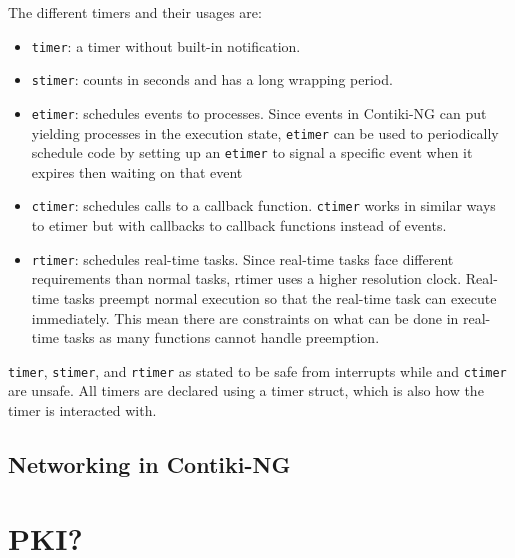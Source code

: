 \documentclass[0-thesis.tex]{subfiles}
\begin{document}
The different timers and their usages are:
\begin{itemize}
    \item \texttt{timer}: a timer without built-in notification.
    \item \texttt{stimer}: counts in seconds and has a long wrapping period.
    \item \texttt{etimer}: schedules events to processes. Since events in Contiki-NG
            can put yielding processes in the execution state, \texttt{etimer} can be
            used to periodically schedule code by setting up an \texttt{etimer} to
            signal a specific event when it expires then waiting on that event
    \item \texttt{ctimer}: schedules calls to a callback function. \texttt{ctimer}
            works in similar ways to etimer but with callbacks to callback functions
            instead of events.
    \item \texttt{rtimer}: schedules real-time tasks. Since real-time tasks face
            different requirements than normal tasks, rtimer uses a higher resolution
            clock. Real-time tasks preempt normal execution so that the real-time task can
            execute immediately. This mean there are constraints on what can be done in
            real-time tasks as many functions cannot handle preemption.
\end{itemize}

\texttt{timer}, \texttt{stimer}, and \texttt{rtimer} as stated to be safe from interrupts
while  and \texttt{ctimer} are unsafe. All timers are declared using a timer
struct, which is also how the timer is interacted with.

\subsection{Networking in Contiki-NG}
\label{ssec:networking-contiki}


\section{PKI?}
\label{ssec:pki}
\end{document}
